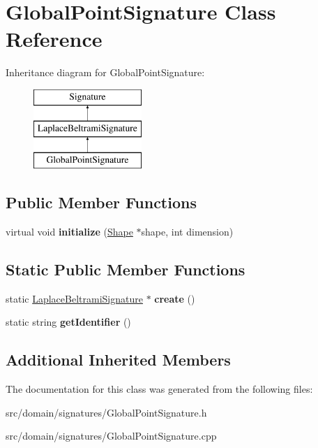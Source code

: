 \hypertarget{class_global_point_signature}{}\section{Global\+Point\+Signature Class Reference}
\label{class_global_point_signature}
Inheritance diagram for Global\+Point\+Signature\+:\begin{figure}[H]
\begin{center}
\leavevmode
\includegraphics[height=3.000000cm]{class_global_point_signature}
\end{center}
\end{figure}
\subsection*{Public Member Functions}
\begin{DoxyCompactItemize}
\item 
\hypertarget{class_global_point_signature_a4850302ad29f52fcaaf53dd897e87be7}{}virtual void {\bfseries initialize} (\hyperlink{class_shape}{Shape} $\ast$shape, int dimension)\label{class_global_point_signature_a4850302ad29f52fcaaf53dd897e87be7}

\end{DoxyCompactItemize}
\subsection*{Static Public Member Functions}
\begin{DoxyCompactItemize}
\item 
\hypertarget{class_global_point_signature_a3d48915c2cf9cfffc26a1574d2168fdb}{}static \hyperlink{class_laplace_beltrami_signature}{Laplace\+Beltrami\+Signature} $\ast$ {\bfseries create} ()\label{class_global_point_signature_a3d48915c2cf9cfffc26a1574d2168fdb}

\item 
\hypertarget{class_global_point_signature_a2e19188d72e93581e5826e7f35a43be8}{}static string {\bfseries get\+Identifier} ()\label{class_global_point_signature_a2e19188d72e93581e5826e7f35a43be8}

\end{DoxyCompactItemize}
\subsection*{Additional Inherited Members}


The documentation for this class was generated from the following files\+:\begin{DoxyCompactItemize}
\item 
src/domain/signatures/Global\+Point\+Signature.\+h\item 
src/domain/signatures/Global\+Point\+Signature.\+cpp\end{DoxyCompactItemize}
